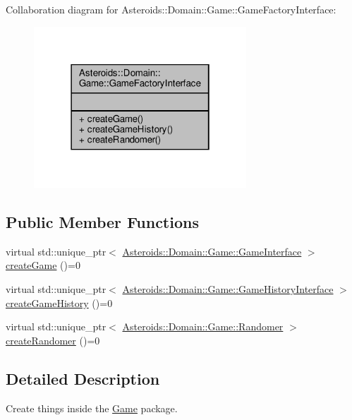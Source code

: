 Collaboration diagram for Asteroids\+:\+:Domain\+:\+:Game\+:\+:Game\+Factory\+Interface\+:\nopagebreak
\begin{figure}[H]
\begin{center}
\leavevmode
\includegraphics[width=226pt]{classAsteroids_1_1Domain_1_1Game_1_1GameFactoryInterface__coll__graph}
\end{center}
\end{figure}
\subsection*{Public Member Functions}
\begin{DoxyCompactItemize}
\item 
virtual std\+::unique\+\_\+ptr$<$ \hyperlink{classAsteroids_1_1Domain_1_1Game_1_1GameInterface}{Asteroids\+::\+Domain\+::\+Game\+::\+Game\+Interface} $>$ \hyperlink{classAsteroids_1_1Domain_1_1Game_1_1GameFactoryInterface_afee076bbbb08048be9df4e7bbc80d4c1}{create\+Game} ()=0
\item 
virtual std\+::unique\+\_\+ptr$<$ \hyperlink{classAsteroids_1_1Domain_1_1Game_1_1GameHistoryInterface}{Asteroids\+::\+Domain\+::\+Game\+::\+Game\+History\+Interface} $>$ \hyperlink{classAsteroids_1_1Domain_1_1Game_1_1GameFactoryInterface_a40f7aecd06daa206b762bfc7896bd47c}{create\+Game\+History} ()=0
\item 
virtual std\+::unique\+\_\+ptr$<$ \hyperlink{classAsteroids_1_1Domain_1_1Game_1_1Randomer}{Asteroids\+::\+Domain\+::\+Game\+::\+Randomer} $>$ \hyperlink{classAsteroids_1_1Domain_1_1Game_1_1GameFactoryInterface_a787a72445e1bc61ef5911b7bbbf18929}{create\+Randomer} ()=0
\end{DoxyCompactItemize}


\subsection{Detailed Description}
Create things inside the \hyperlink{classAsteroids_1_1Domain_1_1Game_1_1Game}{Game} package. 

